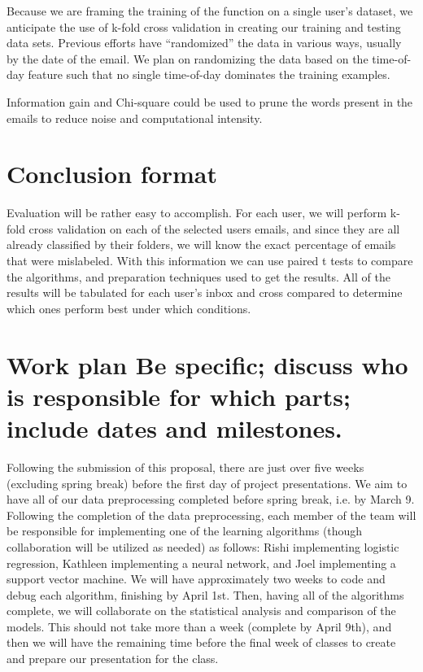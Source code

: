 \documentclass[11pt]{article}
\begin{document}
Because we are framing the training of the function on a single user’s dataset, we anticipate the use of k-fold cross validation in creating our training and testing data sets. Previous efforts have “randomized” the data in various ways, usually by the date of the email. We plan on randomizing the data based on the time-of-day feature such that no single time-of-day dominates the training examples.

Information gain and Chi-square could be used to prune the words present in the emails to reduce noise and computational intensity.
\section{Conclusion format}
\label{sec-5}


Evaluation will be rather easy to accomplish. For each user, we will perform k-fold cross validation on each of the selected users emails, and since they are all already classified by their folders, we will know the exact percentage of emails that were mislabeled. With this information we can use paired t tests to compare the algorithms, and preparation techniques used to get the results. All of the results will be tabulated for each user’s inbox and cross compared to determine which ones perform best under which conditions.
\section{Work plan Be specific; discuss who is responsible for which parts; include dates and milestones.}
\label{sec-6}


Following the submission of this proposal, there are just over five weeks (excluding spring break) before the first day of project presentations.  We aim to have all of our data preprocessing completed before spring break, i.e. by March 9.  Following the completion of the data preprocessing, each member of the team will be responsible for implementing one of the learning algorithms (though collaboration will be utilized as needed) as follows: Rishi implementing logistic regression, Kathleen implementing a neural network, and Joel implementing a support vector machine.  We will have approximately two weeks to code and debug each algorithm, finishing by April 1st.  Then, having all of the algorithms complete, we will collaborate on the statistical analysis and comparison of the models.  This should not take more than a week (complete by April 9th), and then we will have the remaining time before the final week of classes to create and prepare our presentation for the class.
\end{document}
